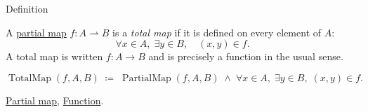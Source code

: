 \NoLocalDependencies

\begin{definitionbox}{Definition}
\begin{definition}
\label{def:total-map}
A \hyperref[def:partial-map]{partial map} $f : A \rightharpoonup B$ is a
\emph{total map} if it is defined on every element of $A$:
\[
\forall x \in A,\; \exists y \in B,\quad (x, y) \in f.
\]
A total map is written $f : A \to B$ and is precisely a function in the
usual sense.
\end{definition}
\end{definitionbox}

\begin{remark*}
\[
\operatorname{TotalMap}(f, A, B)
\;\coloneqq\;
\operatorname{PartialMap}(f, A, B)
\;\land\;
\forall x \in A,\; \exists y \in B,\; (x, y) \in f.
\]
\end{remark*}

\begin{dependencies}
\hyperref[def:partial-map]{Partial map},
\hyperref[def:function]{Function}.
\end{dependencies}

